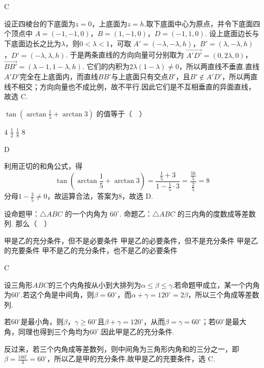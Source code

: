 \begin{answer}
C
\end{answer}

\begin{solution}
设正四棱台的下底面为\(z=0\)，上底面为\(z=h\).取下底面中心为原点，并令下底面四个顶点中
\(A=(-1,-1,0)\)，\(B=(1,-1,0)\)，\(D=(-1,1,0)\).
设上底面边长与下底面边长之比为\(\lambda\)，则\(0<\lambda<1\)，可取
\(A'=(-\lambda,-\lambda,h)\)，\(B'=(\lambda,-\lambda,h)\)，\(D'=(-\lambda,\lambda,h)\).
于是两条直线的方向向量可分别取为
\(\overrightarrow{A'D'}=(0,2\lambda,0)\)，\(\overrightarrow{BB'}=(\lambda-1,1-\lambda,h)\).
它们的内积为\(2\lambda(1-\lambda)\ne0\)，所以两直线不垂直.直线\(A'D'\)完全在上底面内，而直线\(BB'\)与上底面只有交点\(B'\)，且\(B'\notin A'D'\)，所以两直线不相交；方向向量也不成比例，故不平行.因此它们是不互相垂直的异面直线，故选 C.
\end{solution}

\begin{problem}

\(\tan \left(\arctan \frac{1}{5}+\arctan 3\right)\) 的值等于（\(\quad\)）

\choices
    {\(4\)}
    {\(\frac{1}{2}\)}
    {\(\frac{1}{8}\)}
    {\(8\)}
\end{problem}

\begin{answer}
D
\end{answer}

\begin{solution}
利用正切的和角公式，得
\[
\tan\left(\arctan\frac{1}{5}+\arctan 3\right)
=\frac{\frac{1}{5}+3}{1-\frac{1}{5}\cdot3}
=\frac{\frac{16}{5}}{\frac{2}{5}}=8
\]
分母\(1-\frac{3}{5}\ne0\)，故运算合法，答案为\(8\)，故选 D.
\end{solution}

\begin{problem}

设命题甲：\(\triangle ABC\) 的一个内角为 \(60^{\circ}\). 命题乙：\(\triangle ABC\) 的三内角的度数成等差数列. 那么（\(\quad\)）

\choices
    {甲是乙的充分条件，但不是必要条件}
    {甲是乙的必要条件，但不是充分条件}
    {甲是乙的充要条件}
    {甲不是乙的充分条件，也不是乙的必要条件}
\end{problem}

\begin{answer}
C
\end{answer}

\begin{solution}
设三角形\(ABC\)的三个内角按从小到大排列为\(\alpha\le\beta\le\gamma\).若命题甲成立，某一个内角为\(60^{\circ}\).若这个角是中间角，则\(\beta=60^{\circ}\)，而\(\alpha+\gamma=120^{\circ}=2\beta\)，所以三个角成等差数列.

若\(60^{\circ}\)是最小角，则\(\beta\)，\(\gamma\ge60^{\circ}\)且\(\beta+\gamma=120^{\circ}\)，从而\(\beta=\gamma=60^{\circ}\)；若\(60^{\circ}\)是最大角，同理也得到三个角均为\(60^{\circ}\).因此甲是乙的充分条件.

反过来，若三个内角成等差数列，则中间角为三角形内角和的三分之一，即\(\beta=\frac{180^{\circ}}{3}=60^{\circ}\)，所以乙是甲的充分条件.故甲是乙的充要条件，选 C.
\end{solution}

